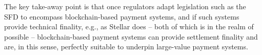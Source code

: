 The key take-away point is that once regulators adapt legislation such as the SFD to encompass blockchain-based payment systems, and if such systems provide technical finality, e.g., as Stellar does -- both of which is in the realm of possible -- blockchain-based payment systems can provide settlement finality and are, in this sense, perfectly suitable to underpin large-value payment systems.

